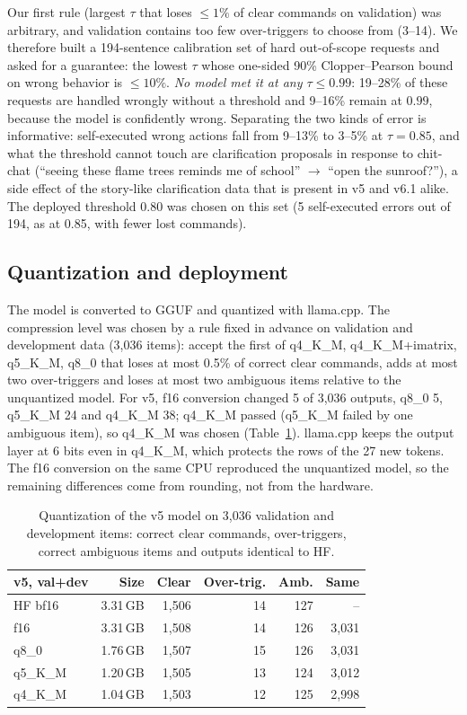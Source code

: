 Our first rule (largest $\tau$ that loses $\le1\%$ of clear commands on validation) was arbitrary, and validation contains too
few over-triggers to choose from (3--14). We therefore built a 194-sentence calibration set of hard out-of-scope requests and
asked for a guarantee: the lowest $\tau$ whose one-sided 90\% Clopper--Pearson bound \citep{clopper1934} on wrong behavior is
$\le10\%$. \emph{No model met it at any $\tau\le0.99$}: 19--28\% of these requests are handled wrongly without a threshold
and 9--16\% remain at $0.99$, because the model is confidently wrong. Separating the two kinds of error is informative:
self-executed wrong actions fall from 9--13\% to 3--5\% at $\tau=0.85$, and what the threshold cannot touch are
clarification proposals in response to chit-chat (``seeing these flame trees reminds me of school'' $\rightarrow$ ``open the
sunroof?''), a side effect of the story-like clarification data that is present in v5 and v6.1 alike. The deployed threshold
0.80 was chosen on this set (5 self-executed errors out of 194, as at 0.85, with fewer lost commands).

\subsection{Quantization and deployment}
\label{sec:quant}

The model is converted to GGUF and quantized with llama.cpp. The compression level was chosen by a rule fixed in advance on
validation and development data (3,036 items): accept the first of q4\_K\_M, q4\_K\_M+imatrix, q5\_K\_M, q8\_0 that loses at most
0.5\% of correct clear commands, adds at most two over-triggers and loses at most two ambiguous items relative to the unquantized
model. For v5, f16 conversion changed 5 of 3,036 outputs, q8\_0 5, q5\_K\_M 24 and q4\_K\_M 38; q4\_K\_M passed (q5\_K\_M failed by
one ambiguous item), so q4\_K\_M was chosen (Table~\ref{tab:quant}). llama.cpp keeps the output layer at 6 bits even in
q4\_K\_M, which protects the rows of the 27 new tokens. The f16 conversion on the same CPU reproduced the unquantized model, so
the remaining differences come from rounding, not from the hardware.

\begin{table}[t]
\centering\small
\setlength{\tabcolsep}{3pt}
\begin{tabular}{@{}lrrrrr@{}}
\toprule
v5, val+dev & Size & Clear & Over-trig. & Amb. & Same \\
\midrule
HF bf16 & 3.31\,GB & 1,506 & 14 & 127 & -- \\
f16 & 3.31\,GB & 1,508 & 14 & 126 & 3,031 \\
q8\_0 & 1.76\,GB & 1,507 & 15 & 126 & 3,031 \\
q5\_K\_M & 1.20\,GB & 1,505 & 13 & 124 & 3,012 \\
q4\_K\_M & 1.04\,GB & 1,503 & 12 & 125 & 2,998 \\
\bottomrule
\end{tabular}
\caption{Quantization of the v5 model on 3,036 validation and development items: correct clear commands, over-triggers,
correct ambiguous items and outputs identical to HF.}
\label{tab:quant}
\end{table}

